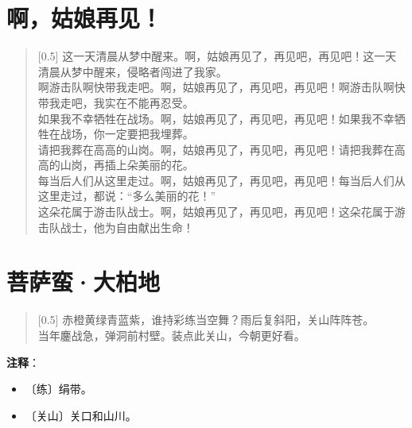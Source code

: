 \documentclass[12pt,UTF-8,openany]{ctexbook}
\begin{document}
\chapter{啊，姑娘再见！}

\begin{large}
    
    \begin{verse}[0.5\linewidth]
        这一天清晨从梦中醒来。啊，姑娘再见了，再见吧，再见吧！这一天清晨从梦中醒来，侵略者闯进了我家。 \\
        啊游击队啊快带我走吧。啊，姑娘再见了，再见吧，再见吧！啊游击队啊快带我走吧，我实在不能再忍受。 \\
        如果我不幸牺牲在战场。啊，姑娘再见了，再见吧，再见吧！如果我不幸牺牲在战场，你一定要把我埋葬。 \\
        请把我葬在高高的山岗。啊，姑娘再见了，再见吧，再见吧！请把我葬在高高的山岗，再插上朵美丽的花。 \\
        每当后人们从这里走过。啊，姑娘再见了，再见吧，再见吧！每当后人们从这里走过，都说：“多么美丽的花！” \\
        这朵花属于游击队战士。啊，姑娘再见了，再见吧，再见吧！这朵花属于游击队战士，他为自由献出生命！
    \end{verse}
    
\end{large}



\chapter{菩萨蛮·大柏地}

\begin{large}
    
    \begin{verse}[0.5\linewidth]
        赤橙黄绿青蓝紫，谁持彩练当空舞？雨后复斜阳，关山阵阵苍。 \\
        当年鏖战急，弹洞前村壁。装点此关山，今朝更好看。
    \end{verse}
    
\end{large}


\newpage

\textbf{注释}：

\vspace{-1em}

\begin{itemize}
    \setlength\itemsep{-0.2em}
    \item 〔练〕绢带。
    \item 〔关山〕关口和山川。
\end{itemize}
\end{document}
